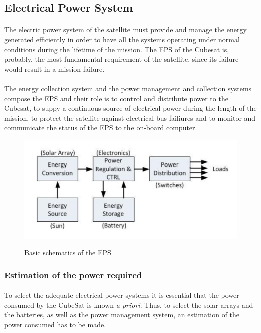 \subsection{Electrical Power System}

\paragraph{}The electric power system of the satellite must provide and manage the energy generated efficiently in order to have all the systems operating under normal conditions during the lifetime of the mission. The EPS of the Cubesat is, probably, the most fundamental requirement of the satellite, since its failure would result in a mission failure. 

\paragraph{}The energy collection system and the power management and  collection systems compose the EPS and their role is to control and distribute power to the Cubesat, to suppy a continuous source of electrical power during the length of the mission, to protect the satellite against electrical bus failiures and to monitor and communicate the status of the EPS to the on-board computer.

\begin{figure}[h]
\includegraphics[scale=0.6]{./sections/SatelliteDesign/images/epsbasics}
\centering
\caption{Basic schematics of the EPS} 
\cite{epsbasics}
\end{figure}

\subsubsection{Estimation of the power required}
\paragraph{}To select the adequate electrical power systems it is essential that the power consumed by the CubeSat is known \textit{a priori}. Thus, to select the solar arrays and the batteries, as well as the power management system, an estimation of the power consumed has to be made.

